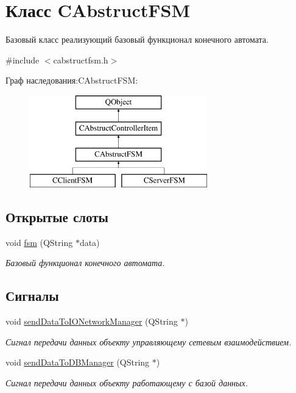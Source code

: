 \hypertarget{class_c_abstruct_f_s_m}{}\section{Класс C\+Abstruct\+F\+SM}
\label{class_c_abstruct_f_s_m}


Базовый класс реализующий базовый функционал конечного автомата.  




{\ttfamily \#include $<$cabstructfsm.\+h$>$}

Граф наследования\+:C\+Abstruct\+F\+SM\+:\begin{figure}[H]
\begin{center}
\leavevmode
\includegraphics[height=4.000000cm]{class_c_abstruct_f_s_m}
\end{center}
\end{figure}
\subsection*{Открытые слоты}
\begin{DoxyCompactItemize}
\item 
void \hyperlink{class_c_abstruct_f_s_m_ae06497e1f93385cd6c20eaa84fc253c1}{fsm} (Q\+String $\ast$data)
\begin{DoxyCompactList}\small\item\em Базовый функционал конечного автомата. \end{DoxyCompactList}\end{DoxyCompactItemize}
\subsection*{Сигналы}
\begin{DoxyCompactItemize}
\item 
void \hyperlink{class_c_abstruct_f_s_m_a542570a7469e3923eeace7c3c308ff97}{send\+Data\+To\+I\+O\+Network\+Manager} (Q\+String $\ast$)
\begin{DoxyCompactList}\small\item\em Сигнал передачи данных объекту управляющему сетевым взаимодействием. \end{DoxyCompactList}\item 
void \hyperlink{class_c_abstruct_f_s_m_a8b3e4a9134df07825f357d16e6d7c436}{send\+Data\+To\+D\+B\+Manager} (Q\+String $\ast$)
\begin{DoxyCompactList}\small\item\em Сигнал передачи данных объекту работающему с базой данных. \end{DoxyCompactList}\end{DoxyCompactItemize}
